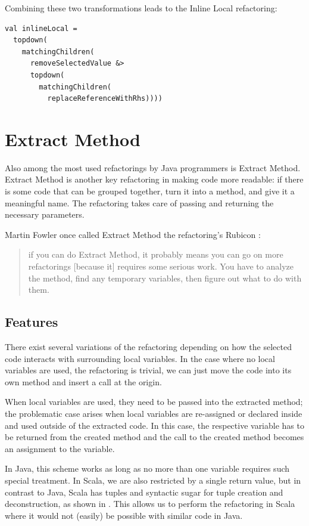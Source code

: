 \documentclass[10pt,a4paper,oneside]{scrreprt}
\begin{document}
Combining these two transformations leads to the Inline Local refactoring:
\begin{lstlisting}
val inlineLocal = 
  topdown(
    matchingChildren(
      removeSelectedValue &> 
      topdown(
        matchingChildren(
          replaceReferenceWithRhs))))
\end{lstlisting}


\section{Extract Method}

Also among the most used refactorings by Java programmers is Extract Method. Extract Method is another key refactoring in making code more readable: if there is some code that can be grouped together, turn it into a method, and give it a meaningful name. The refactoring takes care of passing and returning the necessary parameters.

Martin Fowler once called Extract Method the refactoring's Rubicon \cite{FowlerRubicon}: 

\begin{quotation}
if you can do Extract Method, it probably means you can go on more refactorings [because it] requires some serious work. You have to analyze the method, find any temporary variables, then figure out what to do with them.
\end{quotation} 

\subsection{Features}

There exist several variations of the refactoring depending on how the selected code interacts with surrounding local variables. In the case where no local variables are used, the refactoring is trivial, we can just move the code into its own method and insert a call at the origin. 

When local variables are used, they need to be passed into the extracted method; the problematic case arises when local variables are re-assigned or declared inside and used outside of the extracted code. In this case, the respective variable has to be returned from the created method and the call to the created method becomes an assignment to the variable. 

In Java, this scheme works as long as no more than one variable requires such special treatment. In Scala, we are also restricted by a single return value, but in contrast to Java, Scala has tuples and syntactic sugar for tuple creation and deconstruction, as shown in . This allows us to perform the refactoring in Scala where it would not (easily) be possible with similar code in Java.
\end{document}
